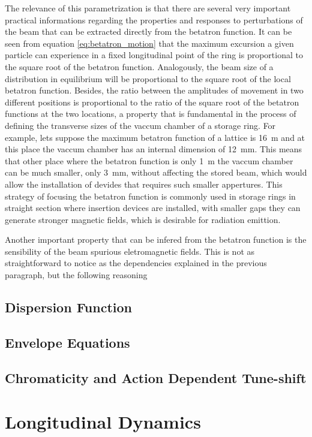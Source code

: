 \documentclass[
	12pt,				%
	openright,			%
	oneside,			%
	a4paper,		%
	chapter=TITLE,		%
	section=TITLE,		%
    brazil,				%
	english,			%
	sumario=tradicional,
	]{abntex2}
\begin{document}
	The relevance of this parametrization is that there are several very important practical informations regarding the properties and responses to perturbations of the beam that can be extracted directly from the betatron function. It can be seen from equation \ref{eq:betatron_motion} that the maximum excursion a given particle can experience in a fixed longitudinal point of the ring is proportional to the square root of the betatron function. Analogously, the beam size of a distribution in equilibrium will be proportional to the square root of the local betatron function. Besides, the ratio between the amplitudes of movement in two different positions is proportional to the ratio of the square root of the betatron functions at the two locations, a property that is fundamental in the process of defining the transverse sizes of the vaccum chamber of a storage ring. For example, lets suppose the maximum betatron function of a lattice is \SI{16}{\meter} and at this place the vaccum chamber has an internal dimension of \SI{12}{\milli\meter}. This means that other place where the betatron function is only \SI{1}{\meter} the vaccum chamber can be much smaller, only \SI{3}{\milli\meter}, without affecting the stored beam, which would allow the installation of devides that requires such smaller appertures. This strategy of focusing the betatron function is commonly used in storage rings in straight section where insertion devices are installed, with smaller gaps they can generate stronger magnetic fields, which is desirable for radiation emittion.

	Another important property that can be infered from the betatron function is the sensibility of the beam spurious eletromagnetic fields. This is not as straightforward to notice as the dependencies explained in the previous paragraph, but the following reasoning

    \subsection{Dispersion Function}
    \subsection{Envelope Equations}
    \subsection{Chromaticity and Action Dependent Tune-shift}
  \section{Longitudinal Dynamics}
\end{document}
